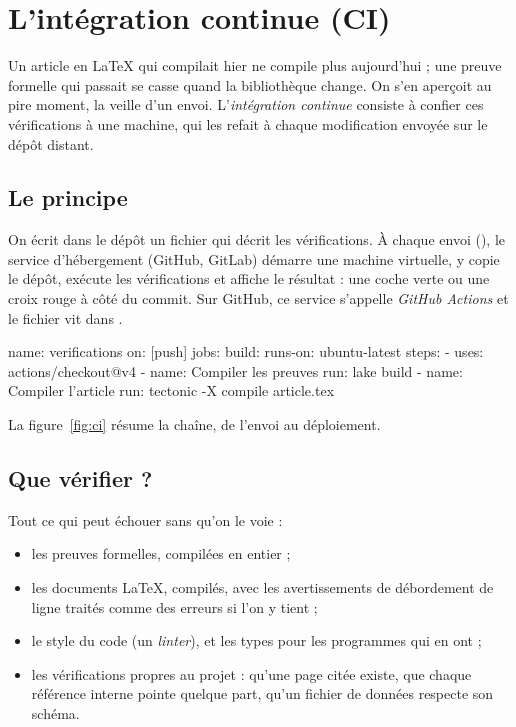 \chapter{L'intégration continue (CI)}

Un article en LaTeX qui compilait hier ne compile plus aujourd'hui ; une preuve formelle
qui passait se casse quand la bibliothèque change. On s'en aperçoit au pire moment, la
veille d'un envoi. L'\emph{intégration continue} consiste à confier ces vérifications à une
machine, qui les refait à chaque modification envoyée sur le dépôt distant.

\section{Le principe}

On écrit dans le dépôt un fichier qui décrit les vérifications. À chaque envoi
(), le service d'hébergement (GitHub, GitLab) démarre une machine virtuelle, y copie le dépôt,
exécute les vérifications et affiche le résultat : une coche verte ou une croix rouge à côté
du commit. Sur GitHub, ce service s'appelle \emph{GitHub Actions} et le fichier vit dans
.

\begin{terminal}
name: verifications
on: [push]
jobs:
  build:
    runs-on: ubuntu-latest
    steps:
      - uses: actions/checkout@v4
      - name: Compiler les preuves
        run: lake build
      - name: Compiler l'article
        run: tectonic -X compile article.tex
\end{terminal}

La figure~\ref{fig:ci} résume la chaîne, de l'envoi au déploiement.



\section{Que vérifier ?}

Tout ce qui peut échouer sans qu'on le voie :
\begin{itemize}
  \item les preuves formelles, compilées en entier ;
  \item les documents LaTeX, compilés, avec les avertissements de débordement de ligne
        traités comme des erreurs si l'on y tient ;
  \item le style du code (un \emph{linter}), et les types pour les programmes qui en ont ;
  \item les vérifications propres au projet : qu'une page citée existe, que chaque
        référence interne pointe quelque part, qu'un fichier de données respecte son schéma.
\end{itemize}

